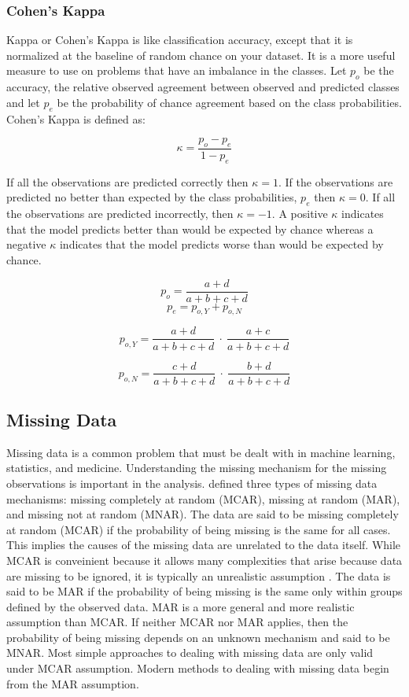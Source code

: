 \documentclass[12pt,]{article}
\begin{document}
\subsubsection{Cohen's Kappa}\label{cohens-kappa}

Kappa or Cohen's Kappa is like classification accuracy, except that it
is normalized at the baseline of random chance on your dataset. It is a
more useful measure to use on problems that have an imbalance in the
classes. Let \(p_o\) be the accuracy, the relative observed agreement
between observed and predicted classes and let \(p_e\) be the
probability of chance agreement based on the class probabilities.
Cohen's Kappa is defined as:

\[
\kappa = \frac{p_o - p_e}{1 - p_e}
\]

If all the observations are predicted correctly then \(\kappa=1\). If
the observations are predicted no better than expected by the class
probabilities, \(p_e\) then \(\kappa=0\). If all the observations are
predicted incorrectly, then \(\kappa=-1\). A positive \(\kappa\)
indicates that the model predicts better than would be expected by
chance whereas a negative \(\kappa\) indicates that the model predicts
worse than would be expected by chance.

\[
p_o = \frac{a+d}{a+b+c+d}
\] \[
p_e = p_{o,Y} + p_{o,N} 
\]

\[
p_{o,Y} = \frac{a+d}{a+b+c+d} ~\cdot~ \frac{a+c}{a+b+c+d}
\]

\[
p_{o,N} = \frac{c+d}{a+b+c+d} ~\cdot~ \frac{b+d}{a+b+c+d}
\]

\subsection{Missing Data}\label{missing-data}

Missing data is a common problem that must be dealt with in machine
learning, statistics, and medicine. Understanding the missing mechanism
for the missing observations is important in the analysis.
\citep{rubin_inference_1976} defined three types of missing data
mechanisms: missing completely at random (MCAR), missing at random
(MAR), and missing not at random (MNAR). The data are said to be missing
completely at random (MCAR) if the probability of being missing is the
same for all cases. This implies the causes of the missing data are
unrelated to the data itself. While MCAR is conveinient because it
allows many complexities that arise because data are missing to be
ignored, it is typically an unrealistic assumption
\citep{van_buuren_flexible_2012}. The data is said to be MAR if the
probability of being missing is the same only within groups defined by
the observed data. MAR is a more general and more realistic assumption
than MCAR. If neither MCAR nor MAR applies, then the probability of
being missing depends on an unknown mechanism and said to be MNAR. Most
simple approaches to dealing with missing data are only valid under MCAR
assumption. Modern methods to dealing with missing data begin from the
MAR assumption.
\end{document}
